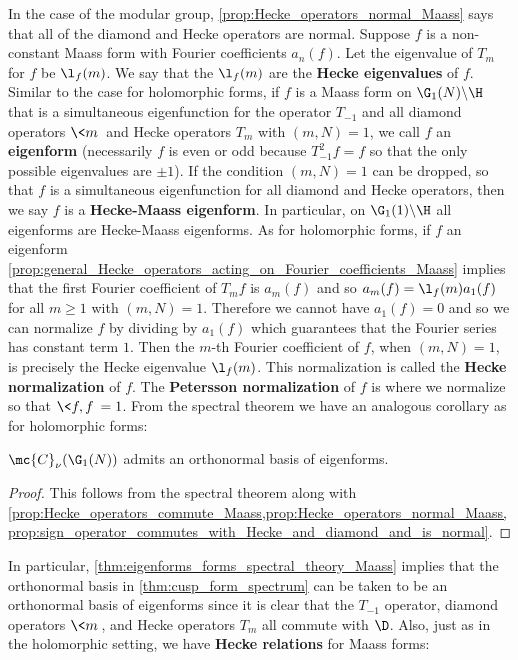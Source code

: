     In the case of the modular group, \cref{prop:Hecke_operators_normal_Maass} says that all of the diamond and Hecke operators are normal. Suppose $f$ is a non-constant Maass form with Fourier coefficients $a_{n}(f)$. Let the eigenvalue of $T_{m}$ for $f$ be $\l_{f}(m)$. We say that the $\l_{f}(m)$ are the \textbf{Hecke eigenvalues} of $f$. Similar to the case for holomorphic forms, if $f$ is a Maass form on $\G_{1}(N)\backslash\H$ that is a simultaneous eigenfunction for the operator $T_{-1}$ and all diamond operators $\<m\>$ and Hecke operators $T_{m}$ with $(m,N) = 1$, we call $f$ an \textbf{eigenform} (necessarily $f$ is even or odd because $T_{-1}^{2}f = f$ so that the only possible eigenvalues are $\pm 1$). If the condition $(m,N) = 1$ can be dropped, so that $f$ is a simultaneous eigenfunction for all diamond and Hecke operators, then we say $f$ is a \textbf{Hecke-Maass eigenform}. In particular, on $\G_{1}(1)\backslash\H$ all eigenforms are Hecke-Maass eigenforms. As for holomorphic forms, if $f$ an eigenform \cref{prop:general_Hecke_operators_acting_on_Fourier_coefficients_Maass} implies that the first Fourier coefficient of $T_{m}f$ is $a_{m}(f)$ and so $a_{m}(f) = \l_{f}(m)a_{1}(f)$ for all $m \ge 1$ with $(m,N) = 1$. Therefore we cannot have $a_{1}(f) = 0$ and so we can normalize $f$ by dividing by $a_{1}(f)$ which guarantees that the Fourier series has constant term $1$. Then the $m$-th Fourier coefficient of $f$, when $(m,N) = 1$, is precisely the Hecke eigenvalue $\l_{f}(m)$. This normalization is called the \textbf{Hecke normalization} of $f$. The \textbf{Petersson normalization} of $f$ is where we normalize so that $\<f,f\> = 1$. From the spectral theorem we have an analogous corollary as for holomorphic forms:

    \begin{theorem}\label{thm:eigenforms_forms_spectral_theory_Maass}
      $\mc{C}_{\nu}(\G_{1}(N))$ admits an orthonormal basis of eigenforms.
    \end{theorem}
    \begin{proof}
      This follows from the spectral theorem along with \cref{prop:Hecke_operators_commute_Maass,prop:Hecke_operators_normal_Maass,prop:sign_operator_commutes_with_Hecke_and_diamond_and_is_normal}.
    \end{proof}

    In particular, \cref{thm:eigenforms_forms_spectral_theory_Maass} implies that the orthonormal basis in \cref{thm:cusp_form_spectrum} can be taken to be an orthonormal basis of eigenforms since it is clear that the $T_{-1}$ operator, diamond operators $\<m\>$, and Hecke operators $T_{m}$ all commute with $\D$. Also, just as in the holomorphic setting, we have \textbf{Hecke relations} for Maass forms:

